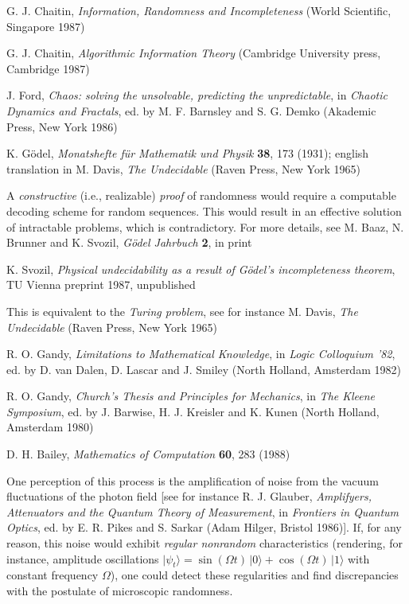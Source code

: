 \begin{thebibliography}{999}

G. J. Chaitin, {\sl Information, Randomness and Incompleteness}
(World Scientific, Singapore 1987)

G. J. Chaitin, {\sl Algorithmic Information Theory}
(Cambridge University press, Cambridge 1987)


J. Ford, {\sl Chaos: solving the unsolvable, predicting the
unpredictable}, in {\sl Chaotic Dynamics and Fractals}, ed. by M. F.
Barnsley and S. G. Demko (Akademic Press, New York 1986)

K. G\"odel, {\sl Monatshefte f\"ur Mathematik und Physik}
{\bf 38}, 173 (1931);
 english translation in
M. Davis, {\sl The Undecidable} (Raven Press, New York 1965)

 A {\sl constructive} (i.e.,
 realizable) {\sl proof} of randomness would require a computable
 decoding scheme for random sequences. This would result in an
 effective solution of intractable problems, which is contradictory.
 For more details, see
 M. Baaz, N. Brunner and K. Svozil, {\sl G\"odel Jahrbuch } {\bf 2}, in
 print

 K. Svozil, {\sl Physical undecidability as a result of G\"odel's
 incompleteness theorem}, TU Vienna preprint 1987, unpublished

 This is equivalent to the {\sl Turing problem}, see for instance
M. Davis, {\sl The Undecidable} (Raven Press, New York 1965)

R. O. Gandy, {\sl Limitations to Mathematical Knowledge},
in {\sl Logic Colloquium '82}, ed. by D. van Dalen, D. Lascar and
J. Smiley (North Holland, Amsterdam 1982)

R. O. Gandy, {\sl Church's Thesis and Principles for Mechanics},
in {\sl The Kleene Symposium}, ed. by J. Barwise, H. J. Kreisler and
K. Kunen (North Holland, Amsterdam 1980)

 D. H. Bailey, {\sl Mathematics of Computation} {\bf 60}, 283 (1988)

 One perception of this process is the amplification of noise
 from the vacuum fluctuations of the photon field [see for instance
 R. J. Glauber, {\sl Amplifyers, Attenuators and the Quantum Theory of
 Measurement}, in {\sl Frontiers in Quantum Optics}, ed. by E. R. Pikes
 and S. Sarkar (Adam Hilger, Bristol 1986)].
 If, for any reason, this noise would exhibit {\sl regular nonrandom}
 characteristics (rendering, for instance,  amplitude oscillations
 $\vert \psi_t\rangle =\sin
 (\Omega t)\, \vert 0\rangle +\cos (\Omega t)\, \vert 1\rangle$ with
 constant frequency $\Omega$), one could detect these regularities
 and find discrepancies with the postulate of microscopic randomness.




\end{thebibliography}
